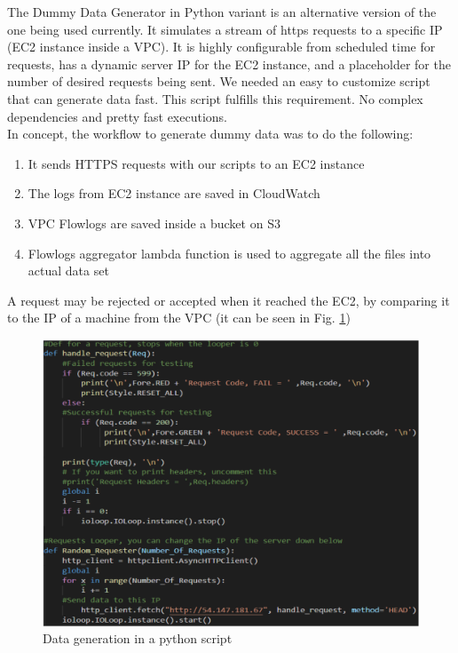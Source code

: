         The Dummy Data Generator in Python variant is an alternative version of the one being used currently. It simulates a stream of https requests to a specific IP (EC2 instance inside a VPC). It is highly configurable from scheduled time for requests, has a dynamic server IP for the EC2 instance, and a placeholder for the number of desired requests being sent. We needed an easy to customize script that can generate data fast. This script fulfills this requirement. No complex dependencies and pretty fast executions.\\ In concept, the workflow to generate dummy data was to do the following:
            \begin{enumerate}
                \item It sends HTTPS requests with our scripts to an EC2 instance
                \item The logs from EC2 instance are saved in CloudWatch
                \item VPC Flowlogs are saved inside a bucket on S3
                \item Flowlogs aggregator lambda function is used to aggregate all the files into actual data set
            \end{enumerate}
        A request may be rejected or accepted when it reached the EC2, by comparing it to the IP of a machine from the VPC (it can be seen in Fig. \ref{fig:data_gen})
        \begin{figure}[h!]
            \centering
            \includegraphics[width=1\textwidth]{images/data-gen-2.png}
            \caption{Data generation in a python script}
            \label{fig:data_gen}
        \end{figure}
